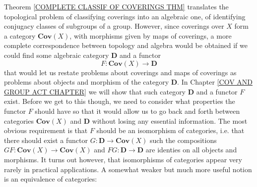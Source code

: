 \documentclass[11pt, letterpaper, oneside]{report}
\theoremstyle{pplain}
\theoremstyle{ddefinition}
\theoremstyle{nnn}
\theoremstyle{eexercise}
\newcommand{\DD}{{\mathbf D}}
\newcommand{\Cov}{{\mathbf{Cov}}}
\begin{document}
Theorem \ref{COMPLETE CLASSIF OF COVERINGS THM} translates the topological problem 
of classifying coverings into an algebraic one, of identifying conjugacy classes of subgroups 
of a group. However,  since coverings over $X$ form a category $\Cov(X)$, with morphisms given by maps 
of coverings, a more complete correspondence between  topology and algebra would be obtained if we 
could find some algebraic category $\DD$ and a functor  
$$F \colon \Cov(X) \to \DD$$ 
that would let us restate problems about coverings and maps of coverings as problems about objects and morphism 
of the category $\DD$. In Chapter \ref{COV AND GROUP ACT  CHAPTER} we will show that such 
category $\DD$ and a functor $F$ exist. Before we get to this though, we need to consider what properties 
the functor $F$ should have so that it would allow us to go back and forth between categories $\Cov(X)$ and 
$\DD$ without losing any essential information. The most obvious requirement is that $F$ should be an 
isomorphism of categories, i.e. that there should exist a functor $G\colon \DD \to \Cov(X)$ such the compositions
$GF\colon \Cov(X) \to \Cov(X)$ and $FG\colon \DD\to \DD$ are identies on all objects and morphisms. 
It turns out however, that isomorphisms of categories appear very rarely in practical applications. 
A somewhat weaker but much more useful notion is an equivalence of categories:
\end{document}

